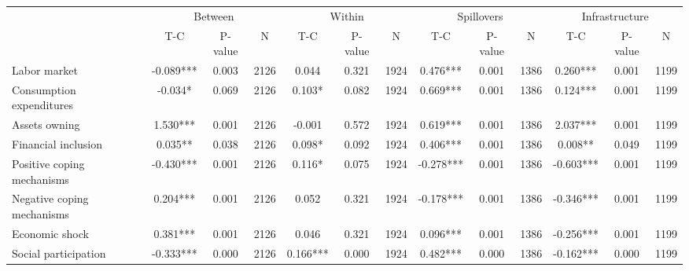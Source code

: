 
\begin{tabular}{l*{12}{c}}\hline&\multicolumn{3}{c}{Between}&\multicolumn{3}{c}{Within}&\multicolumn{3}{c}{Spillovers}&\multicolumn{3}{c}{Infrastructure} \\ \cmidrule(r){2-4}\cmidrule(l){5-7}\cmidrule(l){8-10}\cmidrule(l){9-13} & {T-C} & {P-value} & {N} & {T-C} & {P-value} & {N}  & {T-C} & {P-value} & {N} & {T-C} & {P-value} & {N} \\ \midrule

 Labor market &       -0.089*** &        0.003 & 2126    &        0.044 &        0.321 & 1924    &        0.476*** &        0.001 & 1386 &        0.260*** &        0.001 & 1199 \\ 

 Consumption expenditures &       -0.034* &        0.069 & 2126    &        0.103* &        0.082 & 1924    &        0.669*** &        0.001 & 1386 &        0.124*** &        0.001 & 1199 \\ 

 Assets owning &        1.530*** &        0.001 & 2126    &       -0.001 &        0.572 & 1924    &        0.619*** &        0.001 & 1386 &        2.037*** &        0.001 & 1199 \\ 

 Financial inclusion &        0.035** &        0.038 & 2126    &        0.098* &        0.092 & 1924    &        0.406*** &        0.001 & 1386 &        0.008** &        0.049 & 1199 \\ 

 Positive coping mechanisms &       -0.430*** &        0.001 & 2126    &        0.116* &        0.075 & 1924    &       -0.278*** &        0.001 & 1386 &       -0.603*** &        0.001 & 1199 \\ 

 Negative coping mechanisms &        0.204*** &        0.001 & 2126    &        0.052 &        0.321 & 1924    &       -0.178*** &        0.001 & 1386 &       -0.346*** &        0.001 & 1199 \\ 

 Economic shock &        0.381*** &        0.001 & 2126    &        0.046 &        0.321 & 1924    &        0.096*** &        0.001 & 1386 &       -0.256*** &        0.001 & 1199 \\ 

 Social participation &       -0.333*** &        0.000 & 2126    &        0.166*** &        0.000 & 1924    &        0.482*** &        0.000 & 1386 &       -0.162*** &        0.000 & 1199 \\ 


\end{tabular}
